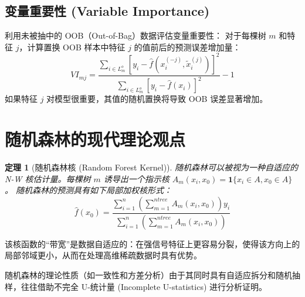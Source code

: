 \documentclass[UTF8]{ctexart}
\newtheorem{theorem}{定理}
\begin{document}
\subsection{变量重要性 (Variable Importance)}
利用未被抽中的 OOB（Out-of-Bag）数据评估变量重要性：
对于每棵树 $m$ 和特征 $j$，计算置换 OOB 样本中特征 $j$ 的值前后的预测误差增加量：
$$ VI_{mj} = \frac{\sum_{i \in L_m^o} [y_i - \hat{f}(x_i^{(-j)}, \tilde{x}_i^{(j)})]^2}{\sum_{i \in L_m^o} [y_i - \hat{f}(x_i)]^2} - 1 $$
如果特征 $j$ 对模型很重要，其值的随机置换将导致 OOB 误差显著增加。

\section{随机森林的现代理论观点}

\begin{theorem}[随机森林核 (Random Forest Kernel)]
随机森林可以被视为一种自适应的 N-W 核估计量。每棵树 $m$ 诱导出一个指示核 $A_m(x_i, x_0) = \mathbf{1}\{x_i \in A, x_0 \in A\}$。
随机森林的预测具有如下局部加权核形式：
$$ \hat{f}(x_0) = \frac{\sum_{i=1}^n \left( \sum_{m=1}^{ntree} A_m(x_i, x_0) \right) y_i}{\sum_{i=1}^n \left( \sum_{m=1}^{ntree} A_m(x_i, x_0) \right)} $$
\end{theorem}
该核函数的“带宽”是数据自适应的：在强信号特征上更容易分裂，使得该方向上的局部邻域更小，从而在处理高维稀疏数据时具有优势。

随机森林的理论性质（如一致性和方差分析）由于其同时具有自适应拆分和随机抽样，往往借助不完全 U-统计量 (Incomplete U-statistics) 进行分析证明。
\end{document}

